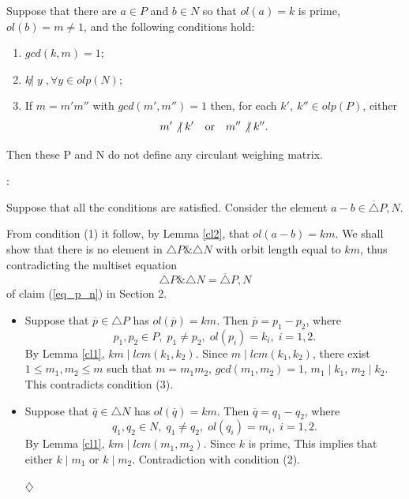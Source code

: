 {\begin{lem}\label{cl3} %
	Suppose that there are $ a \in P $ and $ b \in N $ so that $ ol(a)=k$ is prime, 
	$ ol(b)=m \neq 1 $, and the following conditions hold: 
	\begin{enumerate}
	      \item $ gcd(k,m)=1 $; 
	      \item $ k \not| \; y \; ,\forall y \in olp(N) $;     
	      \item  If $ m=m'm'' $ with $gcd(m',m'')=1$ then, for each $k', \ k'' \in olp(P)$, either  
		     $$ m' \not| \; k' \quad {\rm or} \quad 
		     m'' \not| \; k''.$$ 
	\end{enumerate}
	Then these P and N do not define any circulant weighing matrix.
\end{lem}
\begin{pr}: {\rm
	Suppose that all the conditions are satisfied. Consider the element $a-b \in \overline{\triangle} P,N $. 

	From condition (1) it follow, by Lemma \ref{cl2}, that $ ol(a-b)=km$. 
	We shall show that there is no element in 
	$ \triangle P \& \triangle N $ with orbit length equal to $ km $, thus 
	contradicting the multiset equation  
	   $$ \triangle P \& \triangle N = \overline{\triangle} P,N $$
	of claim (\ref{eq_p_n}) in Section 2.
\begin {itemize}
  \item  Suppose that $ \overline{p} \in {\triangle P} $ has $ol(\overline{p})=km$.
	 Then $ \overline{p}=p_1-p_2 $, where
	 $$ p_{1},p_{2} \in P,\; p_{1} \neq p_{2},\; ol(p_{i})=k_{i},\; i=1,2  .$$
	    By Lemma \ref{cl1}, $ km \mid lcm(k_{1},k_{2})$.
	    Since $ m \mid lcm(k_{1}, k_2)$, there exist  
			$1\leq m_1, m_2 \leq m$ 
	    such that $m=m_{1}m_{2}$, $gcd(m_1,m_2)=1$, $m_1 \mid k_1$, $m_2 \mid k_2$. 
	    This contradicts condition (3).
     \item  Suppose that $ \overline{q} \in \triangle N $ has $ol(\overline{q})=km$.
	    Then $ \overline{q}=q_{1}-q_{2} $, where
	  $$ q_{1},q_{2} \in N,\; q_{1} \neq q_{2},\; ol(q_{i})=m_{i},\; i=1,2  .$$
	    By Lemma \ref{cl1}, $ km \mid lcm(m_{1},m_{2}) $. Since $k$ is prime, 
	    This implies that either
	    $ k \mid m_{1} $ or $ k \mid m_{2} $. Contradiction with condition (2).
	      
	\begin{flushright}
		$\diamondsuit$
	\end{flushright}
\end{itemize}
	}
\end{pr}


}
